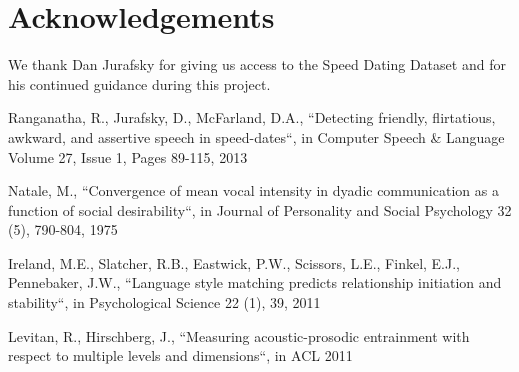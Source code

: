 \documentclass[a4paper]{article}
\begin{document}
\section{Acknowledgements}
We thank Dan Jurafsky for giving us access to the Speed Dating Dataset and for his continued guidance during this project.

\newpage
%
\eightpt

\begin{thebibliography}{10}

Ranganatha, R., Jurafsky, D., McFarland, D.A., ``Detecting friendly, flirtatious, awkward, and assertive speech in speed-dates``, in Computer Speech \& Language
Volume 27, Issue 1, Pages 89-115, 2013

Natale, M.,  ``Convergence of mean vocal intensity in dyadic communication as a function of social desirability``, in Journal of Personality and
Social Psychology 32 (5), 790-804, 1975

Ireland, M.E., Slatcher, R.B., Eastwick, P.W., Scissors, L.E., Finkel, E.J., Pennebaker, J.W., ``Language style matching predicts relationship
initiation and stability``, in Psychological Science 22 (1), 39, 2011

Levitan, R., Hirschberg, J., ``Measuring acoustic-prosodic entrainment with respect to multiple levels and dimensions``, in ACL 2011

\end{thebibliography}
\end{document}
